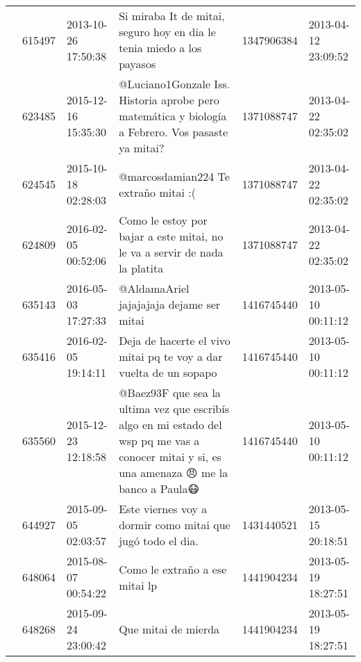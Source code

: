 \begin{tabular}{llllrl}
           & 615497  & 2013-10-26 17:50:38 &                                                                        Si miraba It de mitai, seguro hoy en dia le tenia miedo a los payasos &  1347906384 & 2013-04-12 23:09:52 \\
           & 623485  & 2015-12-16 15:35:30 &                                            @Luciano1Gonzale Iss. Historia aprobe pero matemática y biología a Febrero. Vos pasaste ya mitai? &  1371088747 & 2013-04-22 02:35:02 \\
           & 624545  & 2015-10-18 02:28:03 &                                                                                                         @marcosdamian224 Te extraño mitai :( &  1371088747 & 2013-04-22 02:35:02 \\
           & 624809  & 2016-02-05 00:52:06 &                                                                   Como le estoy por bajar a este mitai, no le va a servir de nada la platita &  1371088747 & 2013-04-22 02:35:02 \\
           & 635143  & 2016-05-03 17:27:33 &                                                                                                     @AldamaAriel jajajajaja dejame ser mitai &  1416745440 & 2013-05-10 00:11:12 \\
           & 635416  & 2016-02-05 19:14:11 &                                                                            Deja de hacerte el vivo mitai pq te voy a dar vuelta de un sopapo &  1416745440 & 2013-05-10 00:11:12 \\
           & 635560  & 2015-12-23 12:18:58 &  @Baez93F que sea la ultima vez que escribís algo en mi estado del wsp pq me vas a conocer mitai y si, es una amenaza 😠 me la banco a Paula😷 &  1416745440 & 2013-05-10 00:11:12 \\
           & 644927  & 2015-09-05 02:03:57 &                                                                                   Este viernes voy a dormir como mitai que jugó todo el dia. &  1431440521 & 2013-05-15 20:18:51 \\
           & 648064  & 2015-08-07 00:54:22 &                                                                                                               Como le extraño a ese mitai lp &  1441904234 & 2013-05-19 18:27:51 \\
           & 648268  & 2015-09-24 23:00:42 &                                                                                                                          Que mitai de mierda &  1441904234 & 2013-05-19 18:27:51 \\

\end{tabular}
